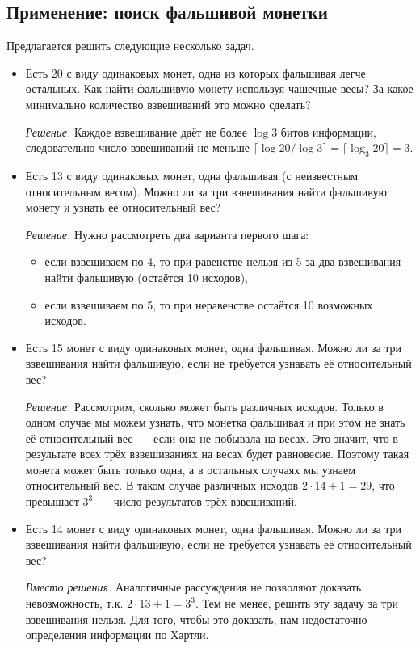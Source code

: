 \documentclass[12pt]{article}
\theoremstyle{definition}
\theoremstyle{plain}
\theoremstyle{remark}
\begin{document}
\subsection{Применение: поиск фальшивой монетки}
Предлагается решить следующие несколько задач.
\begin{itemize}
\item Есть 20 с виду одинаковых монет, одна из которых фальшивая легче остальных. 
Как найти фальшивую монету используя чашечные весы? За какое минимально количество взвешиваний это можно сделать?

\textit{Решение.} Каждое взвешивание даёт не более \(\log 3\) битов информации, следовательно 
число взвешиваний не меньше $\lceil\log 20 / \log 3\rceil = \lceil\log_3 20\rceil = 3$.

\item Есть 13 с виду одинаковых монет, одна фальшивая (с неизвестным относительным весом). 
Можно ли за три взвешивания найти фальшивую монету и узнать её относительный вес?

\textit{Решение.} Нужно рассмотреть два варианта первого шага:
\begin{itemize}
\item если взвешиваем по 4, то при равенстве нельзя из 5 за два взвешивания найти фальшивую (остаётся 10 исходов),
\item если взвешиваем по 5, то при неравенстве остаётся 10 возможных исходов.
\end{itemize}

\item Есть 15 монет с виду одинаковых монет, одна фальшивая. Можно ли за три взвешивания найти фальшивую, 
если не требуется узнавать её относительный вес?

\textit{Решение.} Рассмотрим, сколько может быть различных исходов. Только в одном случае мы можем узнать, что монетка фальшивая и при этом не знать её относительный вес~--- если она не побывала на весах. Это значит, что в результате всех трёх взвешиваниях на весах будет равновесие. Поэтому такая монета может быть только одна, а в остальных случаях мы узнаем относительный вес. В таком случае различных исходов \(2\cdot 14 + 1 = 29\),  что превышает $3^3$~--- число результатов трёх взвешиваний.

\item Есть 14 монет с виду одинаковых монет, одна фальшивая. Можно ли за три взвешивания найти фальшивую, 
если не требуется узнавать её относительный вес?

\textit{Вместо решения.} Аналогичные рассуждения не позволяют доказать невозможность, т.к. \(2\cdot 13 + 1 = 3^3\). 
Тем не менее, решить эту задачу за три взвешивания нельзя. Для того, чтобы это доказать, нам недостаточно 
определения информации по Хартли.

\end{itemize}
\end{document}
